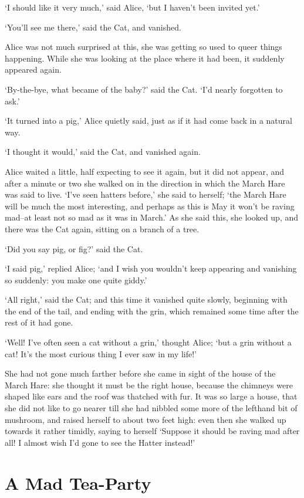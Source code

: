 \documentclass[statementpaper,twoside,openany]{memoir}
\begin{document}
`I should like it very much,' said Alice, `but I haven't been invited yet.'

`You'll see me there,' said the Cat, and vanished.

Alice was not much surprised at this, she was getting so used to queer things happening. While she was looking at the place where it had been, it suddenly appeared again.

`By-the-bye, what became of the baby?' said the Cat. `I'd nearly forgotten to ask.'

`It turned into a pig,' Alice quietly said, just as if it had come back in a natural way.

`I thought it would,' said the Cat, and vanished again.

Alice waited a little, half expecting to see it again, but it did not appear, and after a minute or two she walked on in the direction in which the March Hare was said to live. `I've seen hatters before,' she said to herself; `the March Hare will be much the most interesting, and perhaps as this is May it won't be raving mad--at least not so mad as it was in March.' As she said this, she looked up, and there was the Cat again, sitting on a branch of a tree.

`Did you say pig, or fig?' said the Cat.

`I said pig,' replied Alice; `and I wish you wouldn't keep appearing and vanishing so suddenly: you make one quite giddy.'

`All right,' said the Cat; and this time it vanished quite slowly, beginning with the end of the tail, and ending with the grin, which remained some time after the rest of it had gone.

`Well! I've often seen a cat without a grin,' thought Alice; `but a grin without a cat! It's the most curious thing I ever saw in my life!'

She had not gone much farther before she came in sight of the house of the March Hare: she thought it must be the right house, because the chimneys were shaped like ears and the roof was thatched with fur. It was so large a house, that she did not like to go nearer till she had nibbled some more of the lefthand bit of mushroom, and raised herself to about two feet high: even then she walked up towards it rather timidly, saying to herself `Suppose it should be raving mad after all! I almost wish I'd gone to see the Hatter instead!'

\chapter{A Mad Tea-Party}
\end{document}
